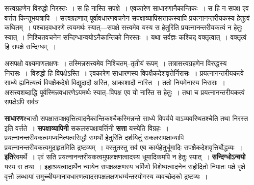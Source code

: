 \documentclass[article,12pt,a4paper]{memoir}
\begin{document}
	  \pstart सत्त्वग्रहणेन विरुद्धो निरस्तः । स हि नास्ति सपक्षे । एवकारेण साधारणानैकान्तिकः । स हि न सपक्ष एव वर्त्तत किन्तूभयत्रापि । सत्त्वग्रहणात् पूर्वावधारणवचनेन सपक्षाव्यापिसत्ताकस्यापि प्रयत्नानन्तरीयकस्य हेतुत्वं कथितम् । पश्चादवधारणे त्वयमर्थः स्यात्—सपक्षे सत्त्वमेव यस्य स हेतुरिति प्रयत्नानन्तरीयकत्वं न हेतुः स्यात् । निश्चितवचनेन सन्दिग्धान्वयोऽनैकान्तिको निरस्तः । यथा सर्वज्ञः कश्चिद् वक्तृत्वात् । वक्तृत्वं हि सपक्षे सन्दिग्धम् ।
	\pend
        

	  \pstart असपक्षो वक्ष्यमाणलक्षणः । तस्मिन्नसत्त्वमेव निश्चितम्--तृतीयं रूपम् । तत्रासत्त्वग्रहणेन विरुद्धस्य निरासः । विरुद्धो हि विपक्षेऽस्ति । एवकारेण साधारणस्य विपक्षैकदेशवृत्तेर्निरासः । प्रयत्नानन्तरीयकत्वे साध्ये ह्यनित्यत्वं विपक्षैकदेशे विद्युदादौ अस्ति, आकाशादौ नास्ति । ततो नियमेनास्य निरासः । असत्त्वशब्दाद्धि पूर्वस्मिन्नवधारणेऽयमर्थः स्यात्--विपक्ष एव यो नास्ति स हेतुः । तथा च प्रयत्नानन्तरीयकत्वं सपक्षेऽपि सर्वत्र
	\pend
      
	  \endgroup
	

	  \pstart \textbf{साधारण}श्चासौ सपक्षासपक्षवृत्तित्वादनैकान्तिकश्चैकस्मिन्नन्ते साध्ये विपर्यये वाऽव्यवस्थितश्चेति तथा निरस्त इति वर्त्तते । \textbf{सपक्षाव्यापिनी} सकलसपक्षावर्त्तिनी \textbf{सत्ता} यस्येति विग्रहः । प्रयत्नानन्तरीयकत्वमप्यनित्यत्वसिद्धौ समर्थो हेतुरिति दर्शयितुं सकलसपक्षाव्यापि प्रयत्नानन्तरीयकत्वमुदाहृतमिति द्रष्टव्यम् । वस्तुतस्तु सर्व एव कार्यहेतुर्धूमादिः सपक्षैकदेशवृत्तिर्बोद्धव्यः । \textbf{इति}रेवमर्थे । एवं सति प्रयत्नानन्तरीयकत्वमुपलक्षणत्वादस्य धूमादिकमपि न हेतुः स्यात् । \textbf{सन्दिग्धोऽन्वयो} यस्य स तथा । इहाश्रयत्वादार्थेन न्यायेन सपक्षलक्षणस्य धर्मिणो विशेष्यत्वादनेन सहोदितो निपातः पक्षे वृक्षे वृत्तौ लब्धायां समुच्चीयमानावधारणत्वादसपक्षलक्षणधर्म्यन्तरयोगस्य व्यवच्छेदको द्रष्टव्यः ।
	\pend
      
\end{document}

